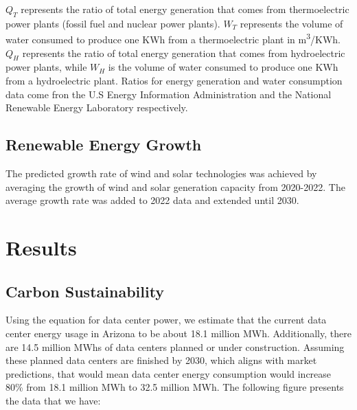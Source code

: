 \documentclass[letterpaper, 12 pt]{article}  %
\begin{document}
\(Q_T\) represents the ratio of total energy generation that comes from thermoelectric power plants (fossil fuel and nuclear power plants). \(W_T\) represents the volume of water consumed to produce one KWh from a thermoelectric plant in m\textsuperscript{3}/KWh. \(Q_H\) represents the ratio of total energy generation that comes from hydroelectric power plants, while \(W_H\) is the volume of water consumed to produce one KWh from a hydroelectric plant. Ratios for energy generation and water consumption data come fron the U.S Energy Information Administration\cite{HistoricalData} and the National Renewable Energy Laboratory respectively\cite{WaterPerEnergy}. 

\subsection{Renewable Energy Growth}
The predicted growth rate of wind and solar technologies was achieved by averaging the growth of wind and solar generation capacity from 2020-2022\cite{HistoricalData}. The average growth rate was added to 2022 data and extended until 2030. 

\section{Results}
\subsection{Carbon Sustainability}
Using the equation for data center power, we estimate that the current data center energy usage in Arizona to be about 18.1 million MWh. Additionally, there are 14.5 million MWhs of data centers planned or under construction. Assuming these planned data centers are finished by 2030, which aligns with market predictions, that would mean data center energy consumption would increase 80\% from 18.1 million MWh to 32.5 million MWh. The following figure presents the data that we have:
\end{document}
